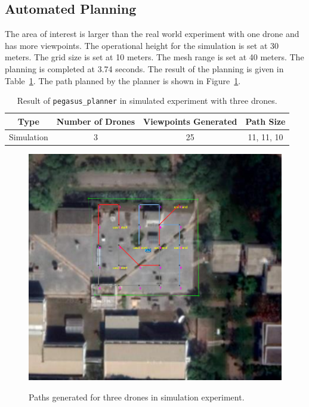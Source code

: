 \subsection{Automated Planning}
The area of interest is larger than the real world experiment with one drone and has more viewpoints. The operational height for the simulation is set at 30 meters. The grid size is set at 10 meters. The mesh range is set at 40 meters. The planning is completed at 3.74 seconds. The result of the planning is given in Table~\ref{tab:simulated-planning}. The path planned by the planner is shown in Figure~\ref{fig:simulated-plan}.

\begin{table}[t]
	\caption[Result of \texttt{pegasus\_planner} in simulated experiment with three drones.]{\small Result of \texttt{pegasus\_planner} in simulated experiment with three drones.}
	\begin{center}
		\begin{tabular}{c|c|c|c}
			\hline Type & Number of Drones & Viewpoints Generated & Path Size \\ \hline \hline
			Simulation & 3 & 25 & 11, 11, 10 \\ \hline
		\end{tabular}
	\end{center}
	\label{tab:simulated-planning}
\end{table}

\begin{figure}
	\centering
	\caption[Paths generated for three drones in simulation experiment.]{\small Paths generated for three drones in simulation experiment.} 
	\includegraphics[width=5in]{figures/experiment/simulated-plan}
	\label{fig:simulated-plan}
\end{figure}

